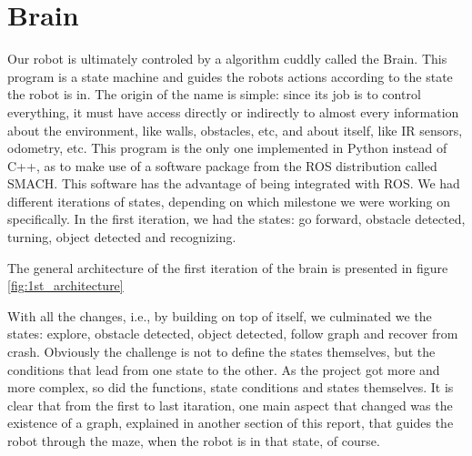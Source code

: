 \section{Brain}

Our robot is ultimately controled by a algorithm cuddly called the Brain.
This program is a state machine and guides the robots actions according to the state the robot is in.
The origin of the name is simple: since its job is to control everything, it must have access directly or indirectly to almost every information about the environment, like walls, obstacles, etc, and about itself, like IR sensors, odometry, etc.
This program is the only one implemented in Python instead of C++, as to make use of a software package from the ROS distribution called SMACH.
This software has the advantage of being integrated with ROS. 
We had different iterations of states, depending on which milestone we were working on specifically.
In the first iteration, we had the states: go forward, obstacle detected, turning, object detected and recognizing.

The general architecture of the first iteration of the brain is presented in figure \ref{fig:1st_architecture}

With all the changes, i.e., by building on top of itself, we culminated we the states: explore, obstacle detected, object detected, follow graph and recover from crash.
Obviously the challenge is not to define the states themselves, but the conditions that lead from one state to the other.
As the project got more and more complex, so did the functions, state conditions and states themselves.
It is clear that from the first to last itaration, one main aspect that changed was the existence of a graph, explained in another section of this report, that guides the robot through the maze, when the robot is in that state, of course.

